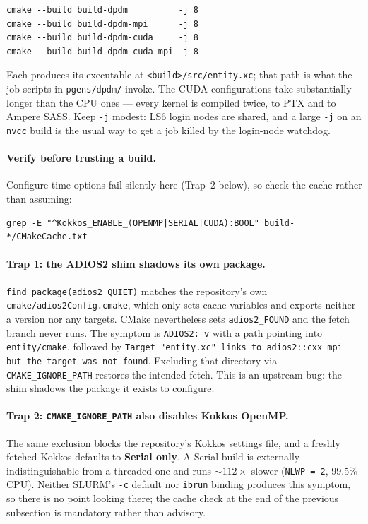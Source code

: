 \documentclass[11pt,a4paper]{article}
\newcommand{\code}[1]{\texttt{\small #1}}
\begin{document}
\begin{lstlisting}
cmake --build build-dpdm          -j 8
cmake --build build-dpdm-mpi      -j 8
cmake --build build-dpdm-cuda     -j 8
cmake --build build-dpdm-cuda-mpi -j 8
\end{lstlisting}

Each produces its executable at \code{<build>/src/entity.xc}; that path is what the job
scripts in \code{pgens/dpdm/} invoke. The CUDA configurations take substantially longer
than the CPU ones --- every kernel is compiled twice, to PTX and to Ampere SASS.
Keep \code{-j} modest: LS6 login nodes are shared, and a large \code{-j} on an
\code{nvcc} build is the usual way to get a job killed by the login-node watchdog.

\paragraph{Verify before trusting a build.} Configure-time options fail silently here
(Trap~2 below), so check the cache rather than assuming:
\begin{lstlisting}
grep -E "^Kokkos_ENABLE_(OPENMP|SERIAL|CUDA):BOOL" build-*/CMakeCache.txt
\end{lstlisting}

\paragraph{Trap 1: the ADIOS2 shim shadows its own package.}
\code{find\_package(adios2 QUIET)} matches the repository's own
\code{cmake/adios2Config.cmake}, which only sets cache variables and exports neither a
version nor any targets. CMake nevertheless sets \code{adios2\_FOUND} and the fetch
branch never runs. The symptom is \code{ADIOS2: v} with a path pointing into
\code{entity/cmake}, followed by \code{Target "entity.xc" links to adios2::cxx\_mpi but
the target was not found}. Excluding that directory via \code{CMAKE\_IGNORE\_PATH}
restores the intended fetch. This is an upstream bug: the shim shadows the package it
exists to configure.

\paragraph{Trap 2: \code{CMAKE\_IGNORE\_PATH} also disables Kokkos OpenMP.}
The same exclusion blocks the repository's Kokkos settings file, and a freshly fetched
Kokkos defaults to \textbf{Serial only}. A Serial build is externally
indistinguishable from a threaded one and runs ${\sim}112\times$ slower
(\code{NLWP = 2}, 99.5\% CPU). Neither SLURM's \code{-c} default nor \code{ibrun}
binding produces this symptom, so there is no point looking there; the cache check at
the end of the previous subsection is mandatory rather than advisory.
\end{document}
